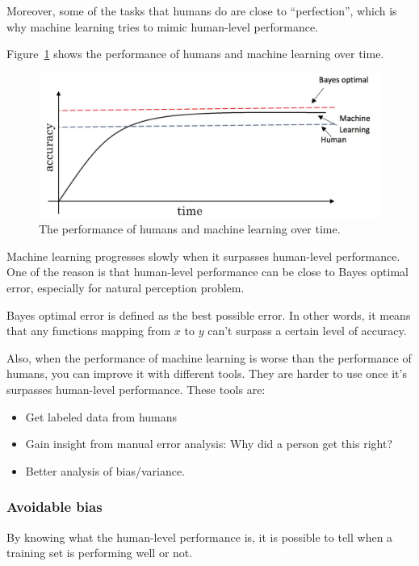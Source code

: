 \documentclass[UTF8]{article}
\begin{document}
Moreover, some of the tasks that humans do are close to ``perfection'', which is why machine
learning tries to mimic human-level performance.

Figure~\ref{figures/human-level} shows the performance of humans and machine learning over time.

\begin{figure}[htb]
    \centering
    \includegraphics[width=40em]{figures/human-level}
    \caption{The performance of humans and machine learning over time.}
    \label{figures/human-level}
\end{figure}

Machine learning progresses slowly when it surpasses human-level performance. One of the reason is
that human-level performance can be close to Bayes optimal error, especially for natural perception
problem.

Bayes optimal error is defined as the best possible error. In other words, it means that any
functions mapping from $x$ to $y$ can't surpass a certain level of accuracy.

Also, when the performance of machine learning is worse than the performance of humans, you can
improve it with different tools. They are harder to use once it's surpasses human-level performance.
These tools are:
\begin{itemize}
    \item Get labeled data from humans
    \item Gain insight from manual error analysis: Why did a person get this right?
    \item Better analysis of bias/variance.
\end{itemize}

\subsubsection{Avoidable bias}
By knowing what the human-level performance is, it is possible to tell when a training set is
performing well or not.
\end{document}
